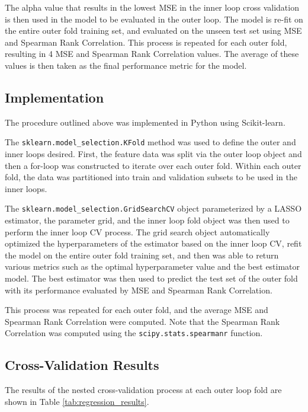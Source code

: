 \documentclass[12pt]{article}
\begin{document}
The alpha value that results in the lowest MSE in the inner loop cross validation is then used in the model to be evaluated in the outer loop. The model is re-fit on the entire outer fold training set, and evaluated on the unseen test set using MSE and Spearman Rank Correlation. This process is repeated for each outer fold, resulting in 4 MSE and Spearman Rank Correlation values. The average of these values is then taken as the final performance metric for the model.

\subsection{Implementation}
The procedure outlined above was implemented in Python using Scikit-learn. 

The \verb|sklearn.model_selection.KFold| method was used to define the outer and inner loops desired. First, the feature data was split via the outer loop object and then a for-loop was constructed to iterate over each outer fold. Within each outer fold, the data was partitioned into train and validation subsets to be used in the inner loops. 

The \verb|sklearn.model_selection.GridSearchCV| object parameterized by a LASSO estimator, the parameter grid, and the inner loop fold object was then used to perform the inner loop CV process. The grid search object automatically optimized the hyperparameters of the estimator based on the inner loop CV, refit the model on the entire outer fold training set, and then was able to return various metrics such as the optimal hyperparameter value and the best estimator model. The best estimator was then used to predict the test set of the outer fold with its performance evaluated by MSE and Spearman Rank Correlation. 

This process was repeated for each outer fold, and the average MSE and Spearman Rank Correlation were computed. Note that the Spearman Rank Correlation was computed using the \verb|scipy.stats.spearmanr| function.

\subsection{Cross-Validation Results}
The results of the nested cross-validation process at each outer loop fold are shown in Table \ref{tab:regression_results}.
\end{document}
